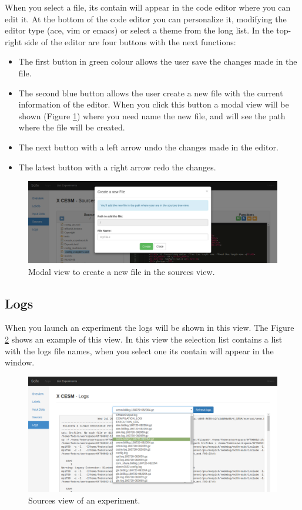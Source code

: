\documentclass[11pt]{article}
\begin{document}
When you select a file, its contain will appear in the code editor where you can edit it. At the bottom of the code editor you can personalize it, modifying the editor type (ace, vim or emacs) or select a theme from the long list. In the top-right side of the editor are four buttons with the next functions:
\begin{itemize}
	\item The first button in green colour allows the user save the changes made in the file.
	\item The second blue button allows the user create a new file with the current information of the editor. When you click this button a modal view will be shown (Figure \ref{fig:sources-new-file}) where you need name the new file, and will see the path where the file will be created.
	\item The next button with a left arrow undo the changes made in the editor.
	\item The latest button with a right arrow redo the changes.
\end{itemize}
\begin{figure}[htp]
	\centering
	\includegraphics[width=\linewidth]{img/sources-new-file}
	\caption{Modal view to create a new file in the sources view.}
	\label{fig:sources-new-file}
\end{figure}

\subsection{Logs}\label{sec:logs}
When you launch an experiment the logs will be shown in this view. The Figure \ref{fig:logs-listed} shows an example of this view. In this view the selection list contains a list with the logs file names, when you select one its contain will appear in the window.
\begin{figure}[htp]
	\centering
	\includegraphics[width=\linewidth]{img/logs-listed}
	\caption{Sources view of an experiment.}
	\label{fig:logs-listed}
\end{figure}
\end{document}
